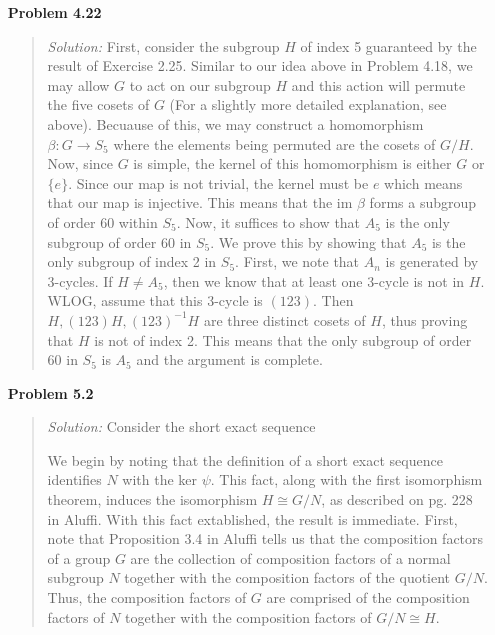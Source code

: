 \documentclass{article}
\newcommand{\Solution}{\textit{Solution: }}
\begin{document}
\begin{enumerate}
        \item[\textbf{Problem 4.22}]
        \begin{quote}
            \Solution First, consider the subgroup $H$ of index 5 guaranteed by the result of Exercise 2.25. Similar to our idea above in Problem 4.18, we may allow $G$ to act on our subgroup $H$ and this action will permute the five cosets 
            of $G$ (For a slightly more detailed explanation, see above). Becuause of this, we may construct a homomorphism $\beta: G \to S_5$ where the elements being permuted are the cosets of $G/H$. Now, since $G$ is simple, the kernel of 
            this homomorphism is either $G$ or $\{e \}$. Since our map is not trivial, the kernel must be $e$ which means that our map is injective. This means that the im $\beta$ forms a subgroup of order 60 within $S_5$. Now, it suffices to show
            that $A_5$ is the only subgroup of order 60 in $S_5$. We prove this by showing that $A_5$ is the only subgroup of index 2 in $S_5$. First, we note that $A_n$ is generated by 3-cycles. If $H \neq A_5$, then we know that at least one 
            3-cycle is not in $H$. WLOG, assume that this 3-cycle is $(123)$. Then $H, (123)H, (123)^{-1}H$ are three distinct cosets of $H$, thus proving that $H$ is not of index 2. This means that the only subgroup of order 60 in $S_5$ is $A_5$
            and the argument is complete. \qedsymbol
        \end{quote}
        \item[\textbf{Problem 5.2}]
        \begin{quote}                
            \Solution Consider the short exact sequence
            \begin{center}
            \end{center}
            We begin by noting that the definition of a short exact sequence identifies $N$ with the ker $\psi$. This fact, along with the first isomorphism theorem,
            induces the isomorphism $H \cong G/N$, as described on pg. 228 in Aluffi. With this fact extablished, the result is immediate. First, note that Proposition 
            3.4 in Aluffi tells us that the composition factors of a group $G$ are the collection of composition factors of a normal subgroup $N$ together with the composition
            factors of the quotient $G/N$. Thus, the composition factors of $G$ are comprised of the composition factors of $N$ together with the composition factors of $G/N \cong H$.

\end{quote}
\end{enumerate}
\end{document}
